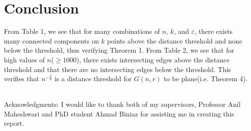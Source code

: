 \documentclass{article}
\newcommand{\dg}{G(n,r)}
\begin{document}
\section{Conclusion}
From Table 1, we see that for many combinations of $n$, $k$, and $\varepsilon$, there exists many connected components on $k$ points above the distance threshold
and none below the threshold, thus verifying Theorem 1. From Table 2, we see that for high values of $n$($\geq 1000$), there exists intersecting edges above the distance threshold and that there are no intersecting edges below the threshold. This verifies that $n^{-\frac{2}{3}}$ is a distance threshold for $\dg$ to be plane(i.e. Theorem 4).
\\
\\
\begin{small}Acknowledgments: I would like to thank both of my supervisors, Professor Anil Maheshwari and PhD student Ahmad Biniaz for assisting me in creating this report.\end{small}



\end{document}
